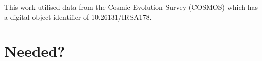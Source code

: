 \documentclass[fleqn,usenatbib]{mnras}
\begin{document}
This work utilised data from the Cosmic Evolution Survey (COSMOS) which has a digital object identifier of 10.26131/IRSA178.







\appendix

\section{Needed?}




\bsp	%
\label{lastpage}
\end{document}
